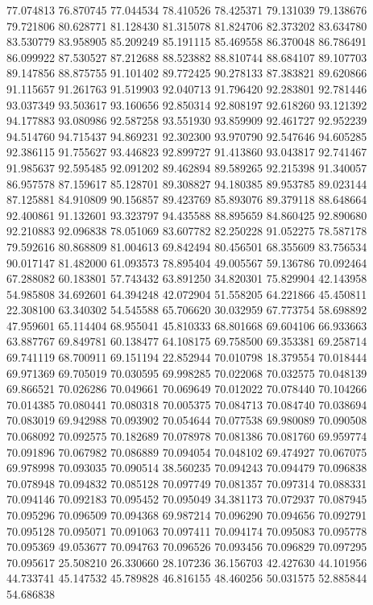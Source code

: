 77.074813
76.870745
77.044534
78.410526
78.425371
79.131039
79.138676
79.721806
80.628771
81.128430
81.315078
81.824706
82.373202
83.634780
83.530779
83.958905
85.209249
85.191115
85.469558
86.370048
86.786491
86.099922
87.530527
87.212688
88.523882
88.810744
88.684107
89.107703
89.147856
88.875755
91.101402
89.772425
90.278133
87.383821
89.620866
91.115657
91.261763
91.519903
92.040713
91.796420
92.283801
92.781446
93.037349
93.503617
93.160656
92.850314
92.808197
92.618260
93.121392
94.177883
93.080986
92.587258
93.551930
93.859909
92.461727
92.952239
94.514760
94.715437
94.869231
92.302300
93.970790
92.547646
94.605285
92.386115
91.755627
93.446823
92.899727
91.413860
93.043817
92.741467
91.985637
92.595485
92.091202
89.462894
89.589265
92.215398
91.340057
86.957578
87.159617
85.128701
89.308827
94.180385
89.953785
89.023144
87.125881
84.910809
90.156857
89.423769
85.893076
89.379118
88.648664
92.400861
91.132601
93.323797
94.435588
88.895659
84.860425
92.890680
92.210883
92.096838
78.051069
83.607782
82.250228
91.052275
78.587178
79.592616
80.868809
81.004613
69.842494
80.456501
68.355609
83.756534
90.017147
81.482000
61.093573
78.895404
49.005567
59.136786
70.092464
67.288082
60.183801
57.743432
63.891250
34.820301
75.829904
42.143958
54.985808
34.692601
64.394248
42.072904
51.558205
64.221866
45.450811
22.308100
63.340302
54.545588
65.706620
30.032959
67.773754
58.698892
47.959601
65.114404
68.955041
45.810333
68.801668
69.604106
66.933663
63.887767
69.849781
60.138477
64.108175
69.758500
69.353381
69.258714
69.741119
68.700911
69.151194
22.852944
70.010798
18.379554
70.018444
69.971369
69.705019
70.030595
69.998285
70.022068
70.032575
70.048139
69.866521
70.026286
70.049661
70.069649
70.012022
70.078440
70.104266
70.014385
70.080441
70.080318
70.005375
70.084713
70.084740
70.038694
70.083019
69.942988
70.093902
70.054644
70.077538
69.980089
70.090508
70.068092
70.092575
70.182689
70.078978
70.081386
70.081760
69.959774
70.091896
70.067982
70.086889
70.094054
70.048102
69.474927
70.067075
69.978998
70.093035
70.090514
38.560235
70.094243
70.094479
70.096838
70.078948
70.094832
70.085128
70.097749
70.081357
70.097314
70.088331
70.094146
70.092183
70.095452
70.095049
34.381173
70.072937
70.087945
70.095296
70.096509
70.094368
69.987214
70.096290
70.094656
70.092791
70.095128
70.095071
70.091063
70.097411
70.094174
70.095083
70.095778
70.095369
49.053677
70.094763
70.096526
70.093456
70.096829
70.097295
70.095617
25.508210
26.330660
28.107236
36.156703
42.427630
44.101956
44.733741
45.147532
45.789828
46.816155
48.460256
50.031575
52.885844
54.686838

